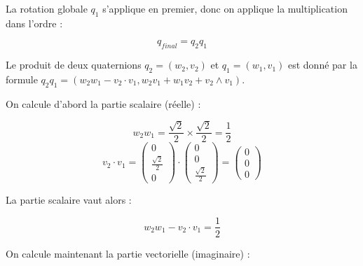 \documentclass[a4paper,12pt]{article}
\begin{document}
\begin{enumerate}
            La rotation globale \( q_1 \) s'applique en premier, donc on applique la multiplication dans l'ordre :

            \[
              q_{final} = q_2 q_1
            \]

            Le produit de deux quaternions \( q_2 = (w_2, v_2) \) et \( q_1 = (w_1, v_1) \) est donné par la formule
            \( q_2 q_1 = (w_2 w_1 − v_2 \cdot v_1, w_2 v_1 + w_1 v_2 + v_2 \wedge v_1) \). \newline

            On calcule d'abord la partie scalaire (réelle) :

            \[ w_2 w_1 = \frac{\sqrt{2}}{2} \times \frac{\sqrt{2}}{2} = \frac{1}{2}\]
            \[ v_2 \cdot v_1 = 
            \begin{pmatrix} 0 \\ \frac{\sqrt{2}}{2} \\ 0 \end{pmatrix}
            \cdot
            \begin{pmatrix} 0 \\ 0 \\ \frac{\sqrt{2}}{2} \end{pmatrix}
            = \begin{pmatrix} 0 \\ 0 \\ 0 \end{pmatrix}
            \]

            La partie scalaire vaut alors :

            \[
               w_2 w_1 - v_2 \cdot v_1 = \frac{1}{2}
            \]

            On calcule maintenant la partie vectorielle (imaginaire) :


\end{enumerate}
\end{document}
